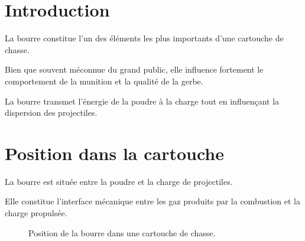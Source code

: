 
\section{Introduction}

La bourre constitue l'un des éléments les plus importants d'une cartouche de
chasse.

Bien que souvent méconnue du grand public, elle influence fortement le
comportement de la munition et la qualité de la gerbe.

\begin{aretenir}

La bourre transmet l'énergie de la poudre à la charge tout en influençant la
dispersion des projectiles.

\end{aretenir}

\section{Position dans la cartouche}

La bourre est située entre la poudre et la charge de projectiles.

Elle constitue l'interface mécanique entre les gaz produits par la combustion
et la charge propulsée.

\begin{figure}[htbp]
\centering


\caption{Position de la bourre dans une cartouche de chasse.}
\label{fig:position_bourre}

\end{figure}

